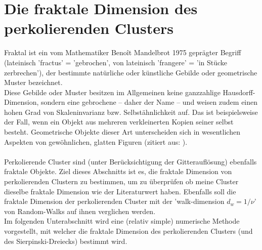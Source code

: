 \documentclass[a4paper, 12pt]{report}
\begin{document}
\section{Die fraktale Dimension des perkolierenden Clusters}
Fraktal ist ein vom Mathematiker Benoît Mandelbrot 1975 geprägter Begriff (lateinisch 'fractus' = 'gebrochen', von lateinisch 'frangere' = 'in Stücke zerbrechen'), der bestimmte natürliche oder künstliche Gebilde oder geo\-metrische Muster bezeichnet.
\\
\noindent Diese Gebilde oder Muster besitzen im Allgemeinen keine ganzzahlige Hausdorff-Dimension, sondern eine gebrochene -- daher der Name -- und weisen zudem einen hohen Grad von Skaleninvarianz bzw. Selbstähnlichkeit auf. Das ist beispielsweise der Fall, wenn ein Objekt aus mehreren verkleinerten Kopien seiner selbst besteht. Geometrische Objekte dieser Art unterscheiden sich in wesentlichen Aspekten von gewöhnlichen, glatten Figuren (zitiert aus: \cite{Fraktal_wiki}).
\\
\\
\noindent Perkolierende Cluster sind (unter Berücksichtigung der Gitterauflösung) ebenfalls fraktale Objekte. Ziel dieses Abschnitts ist es, die fraktale Dimension von perkolierenden Clustern zu bestimmen, um zu überprüfen ob meine Cluster dieselbe fraktale Dimension wie der Literaturwert haben. Ebenfalls soll die fraktale Dimension der perkolierenden Cluster mit der 'walk-dimension $d_w=1/\nu$' von Random-Walks auf ihnen verglichen werden. 
\\
Im folgenden Unterabschnitt wird eine (relativ simple) numerische Methode vorgestellt, mit welcher die fraktale Dimension des perkolierenden Clusters (und des Sierpinski-Dreiecks) bestimmt wird.
\end{document}

